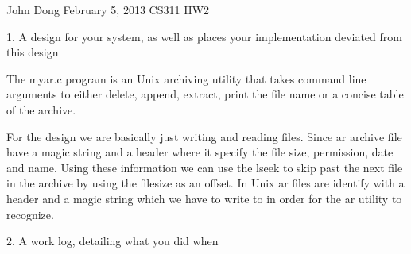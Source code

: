 \documentclass[letterpaper,10pt,titlepage]{article}
\begin{document}
John Dong\newline
February 5, 2013\newline
CS311 HW2\newline
\newline

1. A design for your system, as well as places your implementation deviated from this design\newline
\newline

The myar.c program is an Unix archiving utility that takes command line arguments to either delete, append, extract, print the file name or a concise table of the archive. \newline

For the design we are basically just writing and reading files. Since ar archive file have a magic string and a header where it specify the file size, permission, date and name. Using these information we can use the lseek to skip past the next file in the archive by using the filesize as an offset. In Unix ar files are identify with a header and a magic string which we have to write to in order for the ar utility to recognize. \newline

2. A work log, detailing what you did when\newline
\newline
\end{document}
